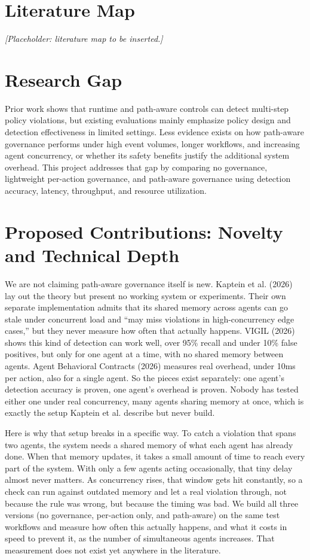 \documentclass[12pt]{article}
\begin{document}
\section{Literature Map}
\textit{[Placeholder: literature map to be inserted.]}

\section{Research Gap}
Prior work shows that runtime and path-aware controls can detect multi-step policy violations, but existing evaluations mainly emphasize policy design and detection effectiveness in limited settings. Less evidence exists on how path-aware governance performs under high event volumes, longer workflows, and increasing agent concurrency, or whether its safety benefits justify the additional system overhead. This project addresses that gap by comparing no governance, lightweight per-action governance, and path-aware governance using detection accuracy, latency, throughput, and resource utilization.

\section{Proposed Contributions: Novelty and Technical Depth}
We are not claiming path-aware governance itself is new. Kaptein et al. (2026) lay out the theory but present no working system or experiments. Their own separate implementation admits that its shared memory across agents can go stale under concurrent load and ``may miss violations in high-concurrency edge cases,'' but they never measure how often that actually happens. VIGIL (2026) shows this kind of detection can work well, over 95\% recall and under 10\% false positives, but only for one agent at a time, with no shared memory between agents. Agent Behavioral Contracts (2026) measures real overhead, under 10ms per action, also for a single agent. So the pieces exist separately: one agent's detection accuracy is proven, one agent's overhead is proven. Nobody has tested either one under real concurrency, many agents sharing memory at once, which is exactly the setup Kaptein et al. describe but never build.

Here is why that setup breaks in a specific way. To catch a violation that spans two agents, the system needs a shared memory of what each agent has already done. When that memory updates, it takes a small amount of time to reach every part of the system. With only a few agents acting occasionally, that tiny delay almost never matters. As concurrency rises, that window gets hit constantly, so a check can run against outdated memory and let a real violation through, not because the rule was wrong, but because the timing was bad. We build all three versions (no governance, per-action only, and path-aware) on the same test workflows and measure how often this actually happens, and what it costs in speed to prevent it, as the number of simultaneous agents increases. That measurement does not exist yet anywhere in the literature.
\end{document}
